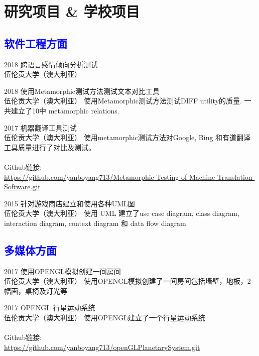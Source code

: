 \documentclass[]{friggeri-cv}
\begin{document}
\section{研究项目 \& 学校项目}
\subsection*{\textcolor{blue}{软件工程方面}}
\begin{entrylist}
  \entry
    {2018}
    {跨语言感情倾向分析测试\\}
    {伍伦贡大学（澳大利亚）}
    {}
\end{entrylist}

\begin{entrylist}
  \entry
    {2018}
    {使用Metamorphic测试方法测试文本对比工具\\}
    {伍伦贡大学（澳大利亚）}
    {使用Metamorphic测试方法测试DIFF utility的质量. 一共建立了10中 metamorphic relations.}
\end{entrylist}

\begin{entrylist}
  \entry
    {2017}
    {机器翻译工具测试\\}
    {伍伦贡大学（澳大利亚）}
    {使用metamorphic测试方法对Google, Bing 和有道翻译工具质量进行了对比及测试。\\\\ Github链接: \\{\small\url{https://github.com/yanboyang713/Metamorphic-Testing-of-Machine-Translation-Software.git}}}
\end{entrylist}

\begin{entrylist}
  \entry
    {2015}
    {针对游戏商店建立和使用各种UML图\\}
    {伍伦贡大学（澳大利亚）}
    {使用 UML 建立了use case diagram, class diagram, interaction diagram, context diagram 和 data flow diagram}
\end{entrylist}

\subsection*{\textcolor{blue}{多媒体方面}}
\begin{entrylist}
  \entry
    {2017}
    {使用OPENGL模拟创建一间房间\\}
    {伍伦贡大学（澳大利亚）}
    {使用OPENGL模拟创建了一间房间包括墙壁，地板，2幅画，桌椅及灯光等}
\end{entrylist}

\begin{entrylist}
  \entry
    {2017}
    {OPENGL 行星运动系统\\}
    {伍伦贡大学（澳大利亚）}
    {使用OPENGL建立了一个行星运动系统
    \\\\ Github链接: \\{\small\url{https://github.com/yanboyang713/openGLPlanetarySystem.git}}}
\end{entrylist}
\end{document}
